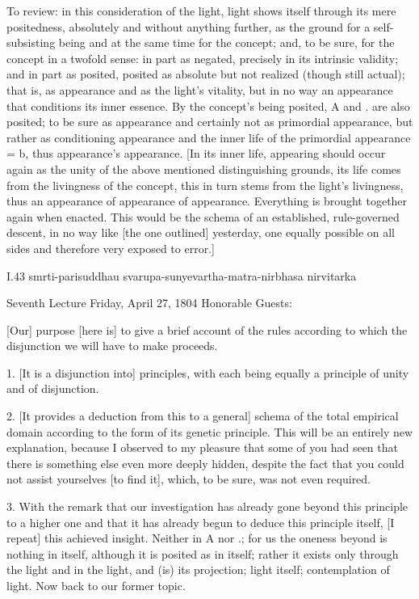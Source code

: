 To review: in this consideration of the light,
light shows itself through its mere positedness,
absolutely and without anything further,
as the ground for a self-subsisting being
and at the same time for the concept;
and, to be sure, for the concept in a twofold sense:
in part as negated, precisely in its intrinsic validity;
and in part as posited, posited as absolute
but not realized (though still actual);
that is, as appearance and as the light's vitality,
but in no way an appearance that conditions its inner essence.
By the concept's being posited,
A and . are also posited;
to be sure as appearance
and certainly not as primordial appearance,
but rather as conditioning appearance
and the inner life of the primordial appearance = b,
thus appearance's appearance.
[In its inner life,
appearing should occur again as
the unity of the above mentioned distinguishing grounds,
its life comes from the livingness of the concept,
this in turn stems from the light's livingness,
thus an appearance of appearance of appearance.
Everything is brought together again when enacted.
This would be the schema of
an established, rule-governed descent,
in no way like [the one outlined] yesterday,
one equally possible on all sides
and therefore very exposed to error.]

I.43
smrti-parisuddhau svarupa-sunyevartha-matra-nirbhasa nirvitarka

Seventh Lecture
Friday, April 27, 1804
Honorable Guests:

[Our] purpose [here is] to give a brief account of
the rules according to which the disjunction
we will have to make proceeds.

1. [It is a disjunction into] principles,
with each being equally a principle
of unity and of disjunction.

2. [It provides a deduction from this to a general]
schema of the total empirical domain
according to the form of its genetic principle.
This will be an entirely new explanation,
because I observed to my pleasure that
some of you had seen that there is
something else even more deeply hidden,
despite the fact that you could not
assist yourselves [to find it],
which, to be sure, was not even required.

3. With the remark that our investigation has
already gone beyond this principle to a higher one
and that it has already begun to deduce this principle itself,
[I repeat] this achieved insight.
Neither in A nor .;
for us the oneness beyond is nothing in itself,
although it is posited as in itself;
rather it exists only through the light
and in the light, and (is) its projection;
light itself; contemplation of light.
Now back to our former topic.

